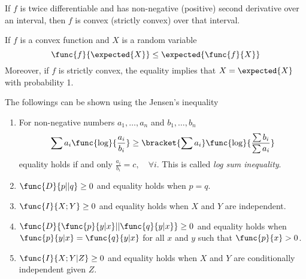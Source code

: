 \begin{theorem}
      If \(f\) is twice differentiable and has non-negative (positive) second derivative over an interval, then \(f\) is convex (strictly convex) over that interval.
 \end{theorem}

 \begin{theorem}
       If \(f\) is a convex function and \(X\) is a random variable
       \begin{equation*}
            \func{f}{\expected{X}} \leq \expected{\func{f}{X}} 
       \end{equation*}
       Moreover, if \(f\) is strictly convex, the equality implies that \(X = \expected{X}\) with probability 1.
 \end{theorem}

 \begin{corollary}
       The followings can be shown using the Jensen's inequality
       \begin{enumerate}
            \item For non-negative numbers \(a_1, \dots , a_n\) and \(b_1 , \dots , b_n\) 
            \begin{equation*}
                  \sum a_i \func{\log}{\dfrac{a_i}{b_i}} \geq \bracket{\sum a_i} \func{\log}{\dfrac{\sum b_i}{\sum a_i}}
            \end{equation*}
            equality holds if and only \(\frac{a_i}{b_i} = c, \quad \forall i\). This is called \textit{log sum inequality}.
             \item \(\func{D}{p || q} \geq 0\) and equality holds when  \(p = q\).
             \item \(\func{I}{X;Y} \geq 0\) and equality holds when \(X\) and \(Y\) are independent.
             \item \(\func{D}{\func{p}{y|x} || \func{q}{y|x}} \geq 0\) and equality holds when \(\func{p}{y|x} = \func{q}{y|x}\) for all \(x\) and \(y\) such that \(\func{p}{x} > 0\).
             \item \(\func{I}{X;Y|Z} \geq 0\) and equality holds when \(X\) and \(Y\) are conditionally independent given \(Z\).
       \end{enumerate}
 \end{corollary}

